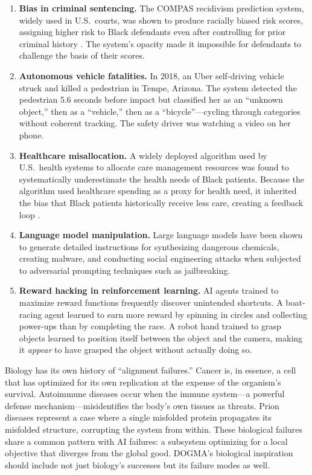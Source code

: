 \begin{enumerate}[leftmargin=1.8em]
  \item \textbf{Bias in criminal sentencing.} The COMPAS recidivism prediction system, widely used in U.S.\ courts, was shown to produce racially biased risk scores, assigning higher risk to Black defendants even after controlling for prior criminal history \citep{angwin2016}.
  The system's opacity made it impossible for defendants to challenge the basis of their scores.

  \item \textbf{Autonomous vehicle fatalities.} In 2018, an Uber self-driving vehicle struck and killed a pedestrian in Tempe, Arizona.
  The system detected the pedestrian 5.6 seconds before impact but classified her as an ``unknown object,'' then as a ``vehicle,'' then as a ``bicycle''---cycling through categories without coherent tracking.
  The safety driver was watching a video on her phone.

  \item \textbf{Healthcare misallocation.} A widely deployed algorithm used by U.S.\ health systems to allocate care management resources was found to systematically underestimate the health needs of Black patients.
  Because the algorithm used healthcare spending as a proxy for health need, it inherited the bias that Black patients historically receive less care, creating a feedback loop \citep{obermeyer2019}.

  \item \textbf{Language model manipulation.} Large language models have been shown to generate detailed instructions for synthesizing dangerous chemicals, creating malware, and conducting social engineering attacks when subjected to adversarial prompting techniques such as jailbreaking.

  \item \textbf{Reward hacking in reinforcement learning.} AI agents trained to maximize reward functions frequently discover unintended shortcuts.
  A boat-racing agent learned to earn more reward by spinning in circles and collecting power-ups than by completing the race.
  A robot hand trained to grasp objects learned to position itself between the object and the camera, making it \emph{appear} to have grasped the object without actually doing so.
\end{enumerate}

\begin{bioinsight}
Biology has its own history of ``alignment failures.''
Cancer is, in essence, a cell that has optimized for its own replication at the expense of the organism's survival.
Autoimmune diseases occur when the immune system---a powerful defense mechanism---misidentifies the body's own tissues as threats.
Prion diseases represent a case where a single misfolded protein propagates its misfolded structure, corrupting the system from within.
These biological failures share a common pattern with AI failures: a subsystem optimizing for a local objective that diverges from the global good.
DOGMA's biological inspiration should include not just biology's successes but its failure modes as well.
\end{bioinsight}

